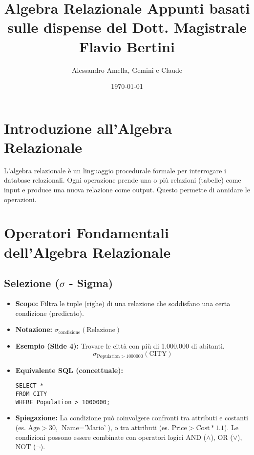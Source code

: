 

\usepackage{hyperref}

\title{Algebra Relazionale
  \large Appunti basati sulle dispense del Dott. Magistrale Flavio Bertini}
\author{Alessandro Amella, Gemini e Claude}
\date{\today}



\maketitle
\tableofcontents
\newpage

\section{Introduzione all'Algebra Relazionale}
L'algebra relazionale è un linguaggio procedurale formale per interrogare i database relazionali. Ogni operazione prende una o più relazioni (tabelle) come input e produce una nuova relazione come output. Questo permette di annidare le operazioni.

\section{Operatori Fondamentali dell'Algebra Relazionale}

\subsection{Selezione (\texorpdfstring{$\sigma$}{sigma} - Sigma)}
\begin{itemize}
    \item \textbf{Scopo:} Filtra le tuple (righe) di una relazione che soddisfano una certa condizione (predicato).
    \item \textbf{Notazione:} $\sigma_{\text{condizione}}(\text{Relazione})$
    \item \textbf{Esempio (Slide 4):} Trovare le città con più di 1.000.000 di abitanti.
          \[ \sigma_{\text{Population}>1000000}(\text{CITY}) \]
    \item \textbf{Equivalente SQL (concettuale):}
\begin{verbatim}
SELECT *
FROM CITY
WHERE Population > 1000000;
\end{verbatim}
    \item \textbf{Spiegazione:} La condizione può coinvolgere confronti tra attributi e costanti (es. $\text{Age} > 30$, $\text{Name} = \text{'Mario'}$), o tra attributi (es. $\text{Price} > \text{Cost}*1.1$). Le condizioni possono essere combinate con operatori logici AND ($\wedge$), OR ($\vee$), NOT ($\neg$).
\end{itemize}

